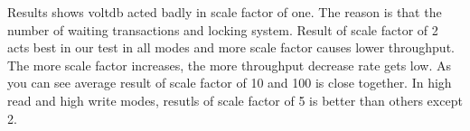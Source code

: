 \documentclass[../main.tex]{subfiles}
\begin{document}
Results shows voltdb acted badly in scale factor of one. The reason is that the number of waiting transactions and locking system. Result of scale factor of 2 acts best in our test in all modes and more scale factor causes lower throughput. The more scale factor increases, the more throughput decrease rate gets low. As you can see average result of scale factor of 10 and 100 is close together.
In high read and high write modes, resutls of scale factor of 5 is better than others except 2.
\begin{minipage}{\textwidth}
\end{minipage}
\end{document}
